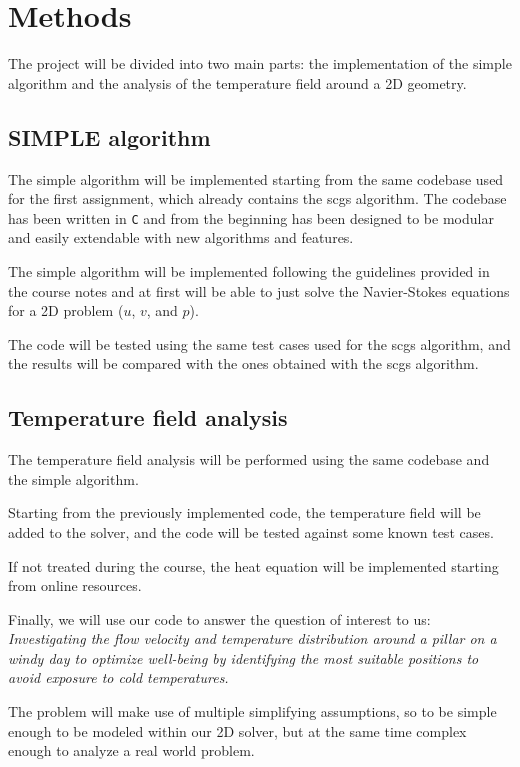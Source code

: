 \section{Methods}

The project will be divided into two main parts: the implementation of the \acrshort{simple} algorithm and the analysis of the temperature field around a 2D geometry.

\subsection{SIMPLE algorithm}

The \acrshort{simple} algorithm will be implemented starting from the same codebase used for the first assignment, which already contains the \acrshort{scgs} algorithm.
The codebase has been written in \texttt{C} and from the beginning has been designed to be modular and easily extendable with new algorithms and features.

The \acrshort{simple} algorithm will be implemented following the guidelines provided in the course notes and at first will be able to just solve the Navier-Stokes equations for a 2D problem ($u$, $v$, and $p$).

The code will be tested using the same test cases used for the \acrshort{scgs} algorithm, and the results will be compared with the ones obtained with the \acrshort{scgs} algorithm.

\subsection{Temperature field analysis}

The temperature field analysis will be performed using the same codebase and the \acrshort{simple} algorithm.

Starting from the previously implemented code, the temperature field will be added to the solver, and the code will be tested against some known test cases.

If not treated during the course, the heat equation will be implemented starting from online resources.

Finally, we will use our code to answer the question of interest to us: \emph{Investigating the flow velocity and temperature distribution around a pillar on a windy day to optimize well-being by identifying the most suitable positions to avoid exposure to cold temperatures.}

The problem will make use of multiple simplifying assumptions, so to be simple enough to be modeled within our 2D solver, but at the same time complex enough to analyze a real world problem.

